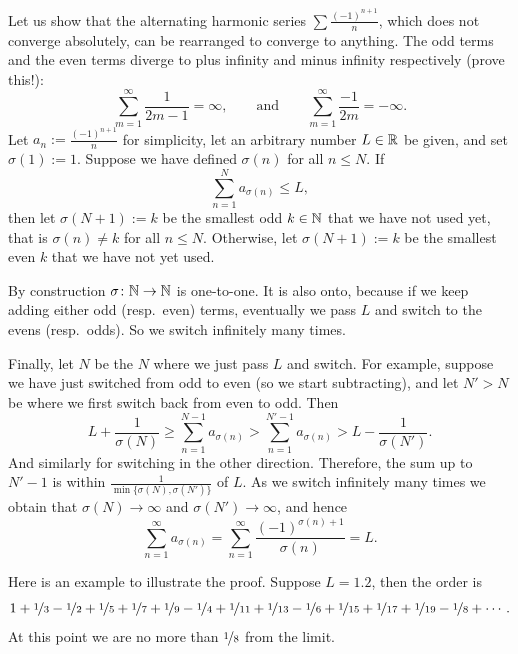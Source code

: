 \begin{example} \label{example:harmonsumanything}
Let us show that the alternating harmonic series $\sum
\frac{{(-1)}^{n+1}}{n}$, which does not converge absolutely, can be
rearranged to converge to anything.
The odd terms and the even terms diverge to
plus infinity and minus infinity respectively (prove this!):
\begin{equation*}
\sum_{m=1}^\infty \frac{1}{2m-1} = \infty, \qquad \text{and} \qquad
\sum_{m=1}^\infty \frac{-1}{2m} = -\infty .
\end{equation*}
Let $a_n := \frac{{(-1)}^{n+1}}{n}$ for simplicity, 
let an arbitrary number $L \in {\mathbb{R}}$ be given, and set $\sigma(1) := 1$.
Suppose we have
defined $\sigma(n)$ for all $n \leq N$.  If
\begin{equation*}
\sum_{n=1}^N a_{\sigma(n)} \leq L ,
\end{equation*}
then let $\sigma(N+1) := k$ be the smallest odd $k \in {\mathbb{N}}$
that we have not used yet,
that is $\sigma(n) \not= k$ for all $n \leq N$.
Otherwise, let $\sigma(N+1) := k$ 
be the smallest even $k$ that we have not yet used.

By construction $\sigma \colon {\mathbb{N}} \to {\mathbb{N}}$ is one-to-one.
It is also onto, because if we keep adding either odd (resp.\ even) terms,
eventually we pass $L$ and switch
to the evens (resp.\ odds).  So we switch infinitely many times.

Finally, let $N$ be the $N$ where we just pass $L$ and switch.
For example, suppose we have just switched from odd to even (so we start
subtracting),
and let $N' > N$ be where we first switch back from even to odd.  Then
\begin{equation*}
L + \frac{1}{\sigma(N)} \geq \sum_{n=1}^{N-1} a_{\sigma(n)}
> \sum_{n=1}^{N'-1} a_{\sigma(n)} > L- \frac{1}{\sigma(N')}.
\end{equation*}
And similarly for switching in the other direction.  Therefore,
the sum up to $N'-1$ is within $\frac{1}{\min \{ \sigma(N), \sigma(N') \}}$
of $L$.  As
we switch infinitely many times we obtain that $\sigma(N) \to \infty$
and $\sigma(N') \to \infty$, and hence
\begin{equation*}
\sum_{n=1}^\infty a_{\sigma(n)} = 
\sum_{n=1}^\infty \frac{{(-1)}^{\sigma(n)+1}}{\sigma(n)} = L .
\end{equation*}

Here is an example to illustrate the proof.  Suppose $L=1.2$, then the order
is
\begin{equation*}
1+\nicefrac{1}{3}-\nicefrac{1}{2}+\nicefrac{1}{5}+\nicefrac{1}{7}+\nicefrac{1}{9}-\nicefrac{1}{4}+\nicefrac{1}{11}+\nicefrac{1}{13}-\nicefrac{1}{6}
+\nicefrac{1}{15}+\nicefrac{1}{17}+\nicefrac{1}{19} - \nicefrac{1}{8} + \cdots .
\end{equation*}
At this point we are no more than $\nicefrac{1}{8}$ from the limit.
\end{example}

